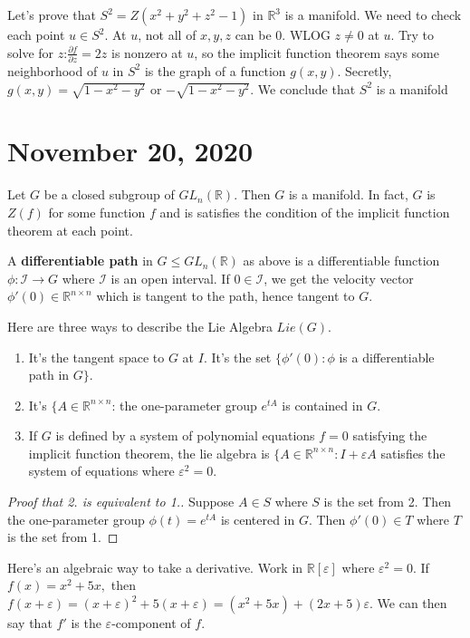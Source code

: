 \documentclass{article}
\newcommand{\vocab}[1]{\textbf{\color{blue!90}\boldmath #1}}
\newcommand{\R}{\mathbb{R}}
\newcommand{\eps}{\varepsilon}
\newcommand{\ra}[1][]{\xrightarrow{#1}}
\begin{document}
\begin{example}
Let's prove that $S^2=Z(x^2+y^2+z^2-1)$ in $\R^3$ is a manifold. We need to check each point $u\in S^2$. At $u$, not all of $x,y,z$ can be 0. WLOG $z\neq 0$ at $u$. Try to solve for $z$:$\frac{\partial f}{\partial z}=2z$ is nonzero at $u$, so the implicit function theorem says some neighborhood of $u$ in $S^2$ is the graph of a function $g(x,y)$. Secretly, $g(x,y)=\sqrt{1-x^2-y^2}$ or $-\sqrt{1-x^2-y^2}$. We conclude that $S^2$ is a manifold
\end{example}
\section{November 20, 2020}
\begin{theorem}
Let $G$ be a closed subgroup of $GL_n(\R)$. Then $G$ is a manifold. In fact, $G$ is $Z(f)$ for some function $f$ and is satisfies the condition of the implicit function theorem at each point.
\end{theorem}
\begin{definition}
A \vocab{differentiable path} in $G\leq GL_n(\R)$ as above is a differentiable function $\phi: \mathcal I\ra G$ where $\mathcal I$ is an open interval. If $0\in \mathcal I$, we get the velocity vector $\phi'(0)\in\R^{n\times n}$ which is tangent to the path, hence tangent to $G$.
\end{definition}
\begin{definition}
Here are three ways to describe the Lie Algebra $Lie(G)$.
\begin{enumerate}
    \item It's the tangent space to $G$ at $I$. It's the set $\{\phi'(0):\phi$ is a differentiable path in $G\}$.
    \item It's $\{A\in\R^{n\times n}$: the one-parameter group $e^{tA}$ is contained in $G$.
    \item If $G$ is defined by a system of polynomial equations $f=0$ satisfying the implicit function theorem, the lie algebra is $\{A\in\R^{n\times n}:I+\eps A$ satisfies the system of equations where $\eps^2=0$.
\end{enumerate}
\end{definition}
\begin{proof}[Proof that 2. is equivalent to 1.]
Suppose $A\in S$ where $S$ is the set from 2. Then the one-parameter group $\phi(t)=e^{tA}$ is centered in $G$. Then $\phi'(0)\in T$ where $T$ is the set from 1.
\end{proof}
Here's an algebraic way to take a derivative. Work in $\R[\eps]$ where $\eps^2=0$. If $f(x)=x^2+5x,$ then $f(x+\eps)=(x+\eps)^2+5(x+\eps)=(x^2+5x)+(2x+5)\eps$. We can then say that $f'$ is the $\eps$-component of $f$.
\end{document}
